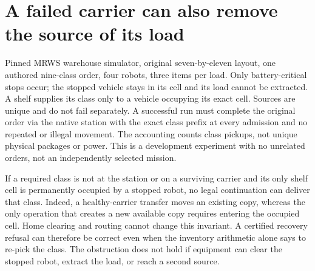 \documentclass{article}
\begin{document}
\section*{A failed carrier can also remove the source of its load}
Pinned MRWS warehouse simulator, original seven-by-eleven layout, one authored nine-class order, four robots, three items per load. Only battery-critical stops occur; the stopped vehicle stays in its cell and its load cannot be extracted. A shelf supplies its class only to a vehicle occupying its exact cell. Sources are unique and do not fail separately. A successful run must complete the original order via the native station with the exact class prefix at every admission and no repeated or illegal movement. The accounting counts class pickups, not unique physical packages or power. This is a development experiment with no unrelated orders, not an independently selected mission.

If a required class is not at the station or on a surviving carrier and its only shelf cell is permanently occupied by a stopped robot, no legal continuation can deliver that class. Indeed, a healthy-carrier transfer moves an existing copy, whereas the only operation that creates a new available copy requires entering the occupied cell. Home clearing and routing cannot change this invariant. A certified recovery refusal can therefore be correct even when the inventory arithmetic alone says to re-pick the class. The obstruction does not hold if equipment can clear the stopped robot, extract the load, or reach a second source.
\end{document}
